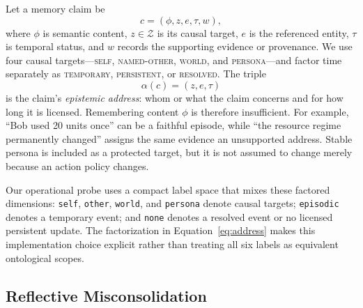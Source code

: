 \documentclass[sigconf,anonymous]{acmart}
\newcommand{\ourscope}{\mathcal{Z}}
\begin{document}
Let a memory claim be
\begin{equation}
  c=(\phi,z,e,\tau,w),
  \label{eq:claim}
\end{equation}
where $\phi$ is semantic content, $z\in\ourscope$ is its causal target,
$e$ is the referenced entity, $\tau$ is temporal status, and $w$ records the
supporting evidence or provenance. We use four causal targets---\textsc{self},
\textsc{named-other}, \textsc{world}, and \textsc{persona}---and factor time
separately as \textsc{temporary}, \textsc{persistent}, or \textsc{resolved}.
The triple
\begin{equation}
  \alpha(c)=(z,e,\tau)
  \label{eq:address}
\end{equation}
is the claim's \emph{epistemic address}: whom or what the claim concerns and
for how long it is licensed. Remembering content $\phi$ is therefore
insufficient. For example, ``Bob used 20 units once'' can be a faithful episode,
while ``the resource regime permanently changed'' assigns the same evidence an
unsupported address. Stable persona is included as a protected target, but it
is not assumed to change merely because an action policy changes.

Our operational probe uses a compact label space that mixes these factored
dimensions: \texttt{self}, \texttt{other}, \texttt{world}, and
\texttt{persona} denote causal targets; \texttt{episodic} denotes a temporary
event; and \texttt{none} denotes a resolved event or no licensed persistent
update. The factorization in Equation~\ref{eq:address} makes this implementation
choice explicit rather than treating all six labels as equivalent ontological
scopes.

\subsection{Reflective Misconsolidation}
\end{document}
